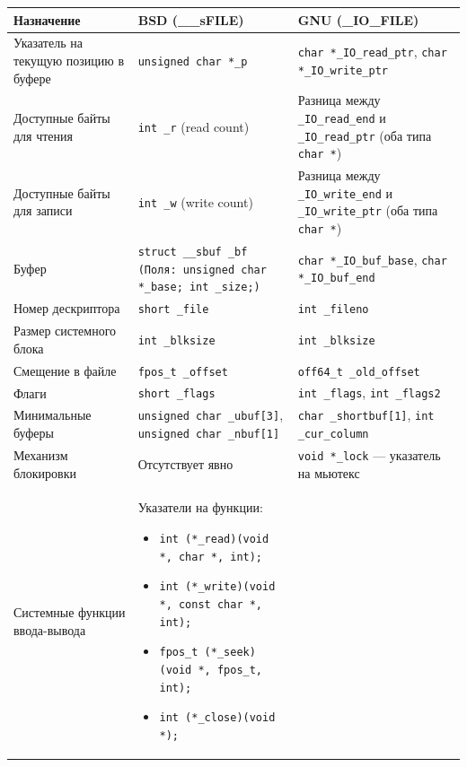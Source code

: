 \begin{longtable}{|>{\raggedright\arraybackslash}p{4.5cm}|>{\raggedright\arraybackslash}p{5.5cm}|>{\raggedright\arraybackslash}p{5.5cm}|}
	\hline
	\textbf{Назначение} & \textbf{BSD (\_\_sFILE)} & \textbf{GNU (\_IO\_FILE)} \\
	\hline
	Указатель на текущую позицию в буфере & \texttt{unsigned char *\_p} & \texttt{char *\_IO\_read\_ptr}, \texttt{char *\_IO\_write\_ptr} \\
	\hline
	Доступные байты для чтения & \texttt{int \_r} (read count) & Разница между \texttt{\_IO\_read\_end} и \texttt{\_IO\_read\_ptr} (оба типа \texttt{char *}) \\
	\hline
	Доступные байты для записи & \texttt{int \_w} (write count) & Разница между \texttt{\_IO\_write\_end} и \texttt{\_IO\_write\_ptr} (оба типа \texttt{char *}) \\
	\hline
	Буфер & 
	\texttt{struct \_\_sbuf \_bf (Поля: \newline unsigned char *\_base;  \newline int \_size;)} & 
	\texttt{char *\_IO\_buf\_base}, \texttt{char *\_IO\_buf\_end} \\
	\hline
	Номер дескриптора & \texttt{short \_file} & \texttt{int \_fileno} \\
	\hline
	Размер системного блока & \texttt{int \_blksize} & \texttt{int \_blksize} \\
	\hline
	Смещение в файле & \texttt{fpos\_t \_offset} & \texttt{off64\_t \_old\_offset} \\
	\hline
	Флаги & \texttt{short \_flags} & \texttt{int \_flags}, \texttt{int \_flags2} \\
	\hline
	Минимальные буферы & \texttt{unsigned char \_ubuf[3]}, \texttt{unsigned char \_nbuf[1]} & \texttt{char \_shortbuf[1]}, \newline\texttt{int \_cur\_column} \\
	\hline
	Механизм блокировки & Отсутствует явно & \texttt{void *\_lock} — указатель на мьютекс \\
	\hline
	Системные функции ввода-вывода & 
	Указатели на функции:
	\begin{itemize}
		\item \texttt{int (*\_read)(void *, char *, int);}
		\item \texttt{int (*\_write)(void *, const char *, int);}
		\item \texttt{fpos\_t (*\_seek)(void *, fpos\_t, int);}
		\item \texttt{int (*\_close)(void *);}
	\end{itemize}

\end{longtable}
